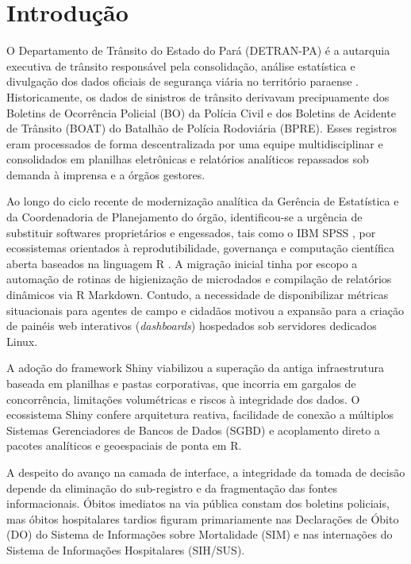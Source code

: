 \documentclass[sigconf, nonacm, screen, language=portuguese, language=spanish, language={main=english}]{acmart}
\begin{document}
\maketitle
{}

\section{Introdução}
O Departamento de Trânsito do Estado do Pará (DETRAN-PA) é a autarquia executiva de trânsito responsável pela consolidação, análise estatística e divulgação dos dados oficiais de segurança viária no território paraense \cite{detran2024}. Historicamente, os dados de sinistros de trânsito derivavam precipuamente dos Boletins de Ocorrência Policial (BO) da Polícia Civil e dos Boletins de Acidente de Trânsito (BOAT) do Batalhão de Polícia Rodoviária (BPRE). Esses registros eram processados de forma descentralizada por uma equipe multidisciplinar e consolidados em planilhas eletrônicas e relatórios analíticos repassados sob demanda à imprensa e a órgãos gestores.

Ao longo do ciclo recente de modernização analítica da Gerência de Estatística e da Coordenadoria de Planejamento do órgão, identificou-se a urgência de substituir softwares proprietários e engessados, tais como o IBM SPSS \cite{ibm2020}, por ecossistemas orientados à reprodutibilidade, governança e computação científica aberta baseados na linguagem R \cite{rcore2024}. A migração inicial tinha por escopo a automação de rotinas de higienização de microdados e compilação de relatórios dinâmicos via R Markdown. Contudo, a necessidade de disponibilizar métricas situacionais para agentes de campo e cidadãos motivou a expansão para a criação de painéis web interativos (\textit{dashboards}) hospedados sob servidores dedicados Linux.

A adoção do framework Shiny \cite{shiny2024} viabilizou a superação da antiga infraestrutura baseada em planilhas e pastas corporativas, que incorria em gargalos de concorrência, limitações volumétricas e riscos à integridade dos dados. O ecossistema Shiny confere arquitetura reativa, facilidade de conexão a múltiplos Sistemas Gerenciadores de Bancos de Dados (SGBD) e acoplamento direto a pacotes analíticos e geoespaciais de ponta em R.

A despeito do avanço na camada de interface, a integridade da tomada de decisão depende da eliminação do sub-registro e da fragmentação das fontes informacionais. Óbitos imediatos na via pública constam dos boletins policiais, mas óbitos hospitalares tardios figuram primariamente nas Declarações de Óbito (DO) do Sistema de Informações sobre Mortalidade (SIM) e nas internações do Sistema de Informações Hospitalares (SIH/SUS). 
\end{document}
